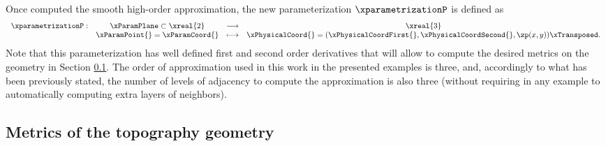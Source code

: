 \documentclass[1p]{elsarticle}
\begin{document}
Once computed the smooth high-order approximation, the new parameterization $\xparametrizationP$ is defined as
\begin{equation}
\begin{array}{rccc}
\xparametrizationP:&\xParamPlane\subset\xreal{2}&\longrightarrow&\xreal{3}\\
&\xParamPoint{}=\xParamCoord{}&\longmapsto & \xPhysicalCoord{}=(\xPhysicalCoordFirst{},\xPhysicalCoordSecond{},\zp(x,y))\xTransposed.
\end{array}
\label{eq:parameterizationHO}
\end{equation}
Note that this parameterization has well defined first and second order derivatives that will allow to compute the desired metrics on the geometry in Section \ref{sec:topoMetrics}.
The order of approximation used in this work in the presented examples is three, and, accordingly to what has been previously stated, the number of levels of adjacency to compute the approximation is also three (without requiring in any example to automatically computing extra layers of neighbors).

\subsection{Metrics of the topography geometry}
\label{sec:topoMetrics}
\end{document}
